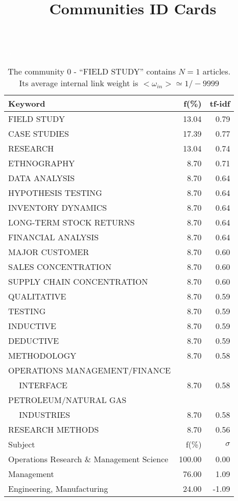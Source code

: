 \documentclass[a4paper,11pt]{report}
\title{{\bf Communities ID Cards}}
\date{\begin{flushleft}This document gather the ``ID Cards'' of the CC communities found within your database.\\
 The CC network was built by keeping a link between articles sharing at least 5 references. The communities characterized here correspond to the ones found in the level 0 (in the sense of the Louvain algo) which gathers more than 0 articles.\\
 These ID cards displays the most frequent keywords, subject categories, journals of publication, institution, countries, authors, references and reference journals of the articles of each community. The significance of an item $\sigma = \sqrt{N} (f - p) / \sqrt{p(1-p)}$ [where $N$ is the number of articles within the community and $f$ and $p$ are the proportion of articles respectively within the community and within the database displaying that item ] is also given (for example $\sigma > 5$ is really highly significant). The tf-idf value which can be calculated by $tf-idf = f*log(frac{1}{p})$ is also given.\\
\vspace{1cm}
\copyright Sebastian Grauwin, Liu Weizhi - (2014) \end{flushleft}}
\begin{document}
\begin{landscape}
\maketitle
\clearpage

\begin{table}[!ht]
\caption{The community 0 - ``FIELD STUDY'' contains $N = 1$ articles. Its average internal link weight is $<\omega_{in}> \simeq 1/-9999$ }
\textcolor{white}{aa}\\
{\scriptsize\begin{tabular}{|l r  r|}
\hline
Keyword & f(\%) & tf-idf \\
\hline
FIELD STUDY & 13.04 & 0.79\\
CASE STUDIES & 17.39 & 0.77\\
RESEARCH & 13.04 & 0.74\\
ETHNOGRAPHY & 8.70 & 0.71\\
DATA ANALYSIS & 8.70 & 0.64\\
HYPOTHESIS TESTING & 8.70 & 0.64\\
INVENTORY DYNAMICS & 8.70 & 0.64\\
LONG-TERM STOCK RETURNS & 8.70 & 0.64\\
FINANCIAL ANALYSIS & 8.70 & 0.64\\
MAJOR CUSTOMER & 8.70 & 0.60\\
SALES CONCENTRATION & 8.70 & 0.60\\
SUPPLY CHAIN CONCENTRATION & 8.70 & 0.60\\
QUALITATIVE & 8.70 & 0.59\\
TESTING & 8.70 & 0.59\\
INDUCTIVE & 8.70 & 0.59\\
DEDUCTIVE & 8.70 & 0.59\\
METHODOLOGY & 8.70 & 0.58\\
OPERATIONS MANAGEMENT/FINANCE &  &\\
$\quad$ INTERFACE & 8.70 & 0.58\\
PETROLEUM/NATURAL GAS &  &\\
$\quad$ INDUSTRIES & 8.70 & 0.58\\
RESEARCH METHODS & 8.70 & 0.56\\
\hline
\hline
Subject & f(\%) & $\sigma$\\
\hline
Operations Research \& Management Science & 100.00 & 0.00\\
Management & 76.00 & 1.09\\
Engineering, Manufacturing & 24.00 & -1.09\\

\end{tabular}}
\end{table}
\end{landscape}
\end{document}
